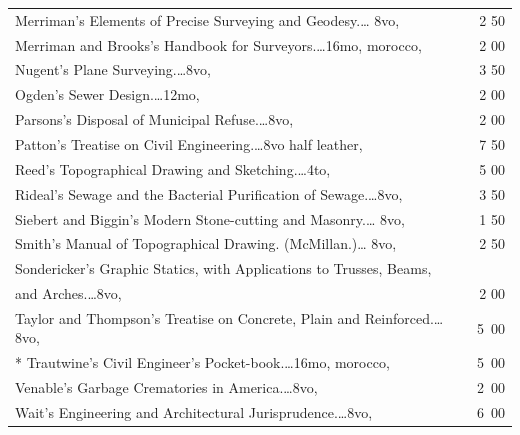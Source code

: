\documentclass[a4paper,12pt]{book}[2004/02/16]
\theoremstyle{ilemma}
\theoremstyle{itheorem}
\theoremstyle{iother}
\theoremstyle{icorollary}
\theoremstyle{numcorollary}
\theoremstyle{idefinition}
\begin{document}
\begin{longtable}{@{}l@{ }r@{}}
Merriman's Elements of Precise Surveying and Geodesy.\dotfill\ldots
8vo, &2 50 \\

Merriman and Brooks's Handbook for Surveyors.\dotfill\ldots 16mo,
morocco, &2 00 \\

Nugent's Plane Surveying.\dotfill\ldots 8vo, &3 50 \\

Ogden's Sewer Design.\dotfill\ldots 12mo, &2 00 \\

Parsons's Disposal of Municipal Refuse.\dotfill\ldots 8vo, &2 00 \\

Patton's Treatise on Civil Engineering.\dotfill\ldots 8vo half
leather, &7 50 \\

Reed's Topographical Drawing and Sketching.\dotfill\ldots 4to, &5 00 \\

Rideal's Sewage and the Bacterial Purification of
Sewage.\dotfill\ldots 8vo, &3 50 \\

Siebert and Biggin's Modern Stone-cutting and Masonry.\dotfill\ldots
8vo, &1 50 \\



Smith's Manual of Topographical Drawing. (McMillan.)\dotfill\ldots
8vo, &2 50 \\

Sondericker's Graphic Statics, with Applications to Trusses, Beams, \\

\nopagebreak

\indent\indent and Arches.\dotfill\ldots 8vo, &2 00 \\

Taylor and Thompson's Treatise on Concrete, Plain and
Reinforced.\dotfill\ldots 8vo, & 5\ 00\\

* Trautwine's Civil Engineer's Pocket-book.\dotfill\ldots 16mo,
  morocco, &5\ 00\\

Venable's Garbage Crematories in America.\dotfill\ldots 8vo, &2\ 00\\

Wait's Engineering and Architectural Jurisprudence.\dotfill\ldots 8vo,
&6\ 00\\


\end{longtable}
\end{document}
